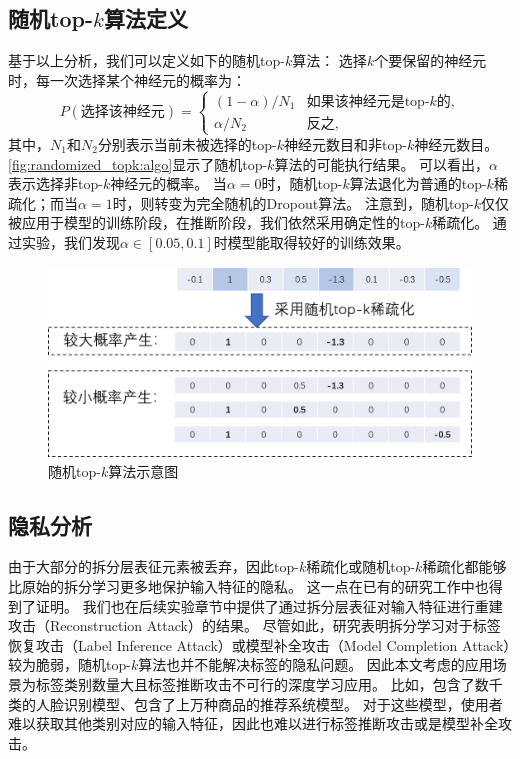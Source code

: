 \subsection{随机top-$k$算法定义}
基于以上分析，我们可以定义如下的随机top-$k$算法：
%
选择$k$个要保留的神经元时，每一次选择某个神经元的概率为：
\begin{equation}
\label{eq:randomized_topk:def}
    P(\text{选择该神经元}) = 
    \begin{cases}
        (1 - \alpha) / N_1  & \text{如果该神经元是top-$k$的,} \\
        \alpha / N_2        & \text{反之,}    
    \end{cases}
\end{equation}
%
其中，$N_1$和$N_2$分别表示当前未被选择的top-$k$神经元数目和非top-$k$神经元数目。
%
\autoref{fig:randomized_topk:algo}显示了随机top-$k$算法的可能执行结果。
%
可以看出，$\alpha$表示选择非top-$k$神经元的概率。
%
当$\alpha=0$时，随机top-$k$算法退化为普通的top-$k$稀疏化；而当$\alpha=1$时，则转变为完全随机的Dropout算法。
%
注意到，随机top-$k$仅仅被应用于模型的训练阶段，在推断阶段，我们依然采用确定性的top-$k$稀疏化。
%
通过实验，我们发现$\alpha \in [0.05, 0.1]$时模型能取得较好的训练效果。
%
\begin{figure}[h!]
    \centering
    \includegraphics[width=0.7\linewidth]{Z_Resources/随机topk_算法示意.png}
    \caption{随机top-$k$算法示意图}
    \label{fig:randomimzed_topk:algo}
\end{figure}


\subsection{隐私分析}
由于大部分的拆分层表征元素被丢弃，因此top-$k$稀疏化或随机top-$k$稀疏化都能够比原始的拆分学习更多地保护输入特征的隐私。
%
这一点在已有的研究工作中也得到了证明。
%
我们也在后续实验章节中提供了通过拆分层表征对输入特征进行重建攻击（Reconstruction Attack）的结果。
%
尽管如此，研究表明拆分学习对于标签恢复攻击（Label Inference Attack）或模型补全攻击（Model Completion Attack）较为脆弱，随机top-$k$算法也并不能解决标签的隐私问题。
%
因此本文考虑的应用场景为标签类别数量大且标签推断攻击不可行的深度学习应用。
%
比如，包含了数千类的人脸识别模型、包含了上万种商品的推荐系统模型。
%
对于这些模型，使用者难以获取其他类别对应的输入特征，因此也难以进行标签推断攻击或是模型补全攻击。
%


